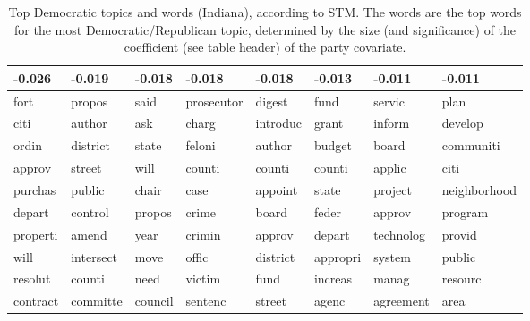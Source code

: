 \begin{table}[ht]
\centering
\begin{tabular}{llllllll}
  \hline
-0.026 & -0.019 & -0.018 & -0.018 & -0.018 & -0.013 & -0.011 & -0.011 \\ 
  \hline
fort & propos & said & prosecutor & digest & fund & servic & plan \\ 
  citi & author & ask & charg & introduc & grant & inform & develop \\ 
  ordin & district & state & feloni & author & budget & board & communiti \\ 
  approv & street & will & counti & counti & counti & applic & citi \\ 
  purchas & public & chair & case & appoint & state & project & neighborhood \\ 
  depart & control & propos & crime & board & feder & approv & program \\ 
  properti & amend & year & crimin & approv & depart & technolog & provid \\ 
  will & intersect & move & offic & district & appropri & system & public \\ 
  resolut & counti & need & victim & fund & increas & manag & resourc \\ 
  contract & committe & council & sentenc & street & agenc & agreement & area \\ 
   \hline
\end{tabular}
\caption{Top Democratic topics and words (Indiana), according to STM. 
The words are the top words for the most Democratic/Republican topic, determined
by the size (and significance) of the coefficient (see table header) of the party covariate.} 
\label{tabSTMINDem}
\end{table}


